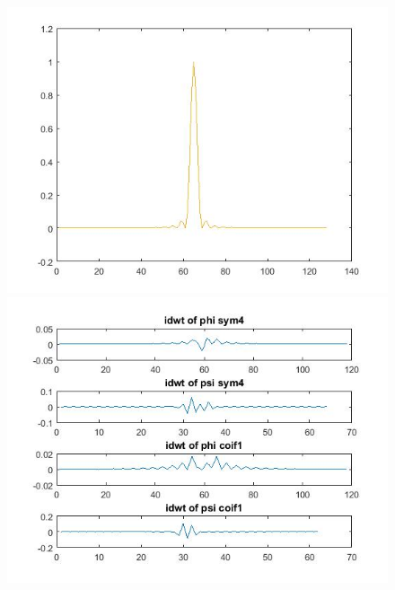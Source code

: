 \documentclass{article}
\begin{document}
\begin{figure}[H]
  \includegraphics[scale=.5]{4_same}
  \includegraphics[scale=.5]{4_idwt}
  \end{figure}
\end{document}
